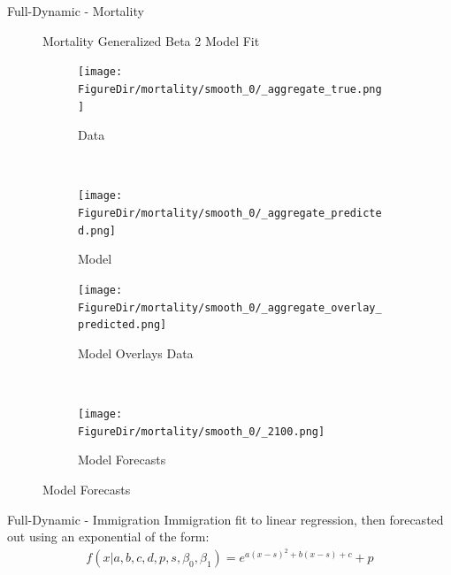 \documentclass[12pt]{beamer}
\newcommand*{\FigureDir}{../graphs}
\begin{document}
\begin{frame}{Full-Dynamic - Mortality}

	\begin{figure}[H]
		Mortality Generalized Beta 2 Model Fit
		\begin{subfigure}{0.5\textwidth}
			\centering
			\texttt{[image: \\FigureDir/mortality/smooth\_0/\_aggregate\_true.png]}
			\vspace{-5mm}
			\caption{Data}
		\end{subfigure}%
		~ %
		\begin{subfigure}{0.5\textwidth}
			\centering
			\texttt{[image: \\FigureDir/mortality/smooth\_0/\_aggregate\_predicted.png]}
			\vspace{-5mm}
			\caption{Model}
		\end{subfigure}%
		\newline
		\begin{subfigure}{0.5\textwidth}
			\centering
			\texttt{[image: \\FigureDir/mortality/smooth\_0/\_aggregate\_overlay\_predicted.png]}
			\vspace{-5mm}
			\caption{Model Overlays Data}
		\end{subfigure}%
		~ %
		\begin{subfigure}{0.5\textwidth}
			\centering
			\texttt{[image: \\FigureDir/mortality/smooth\_0/\_2100.png]}
			\vspace{-5mm}
			\caption{Model Forecasts}
		\end{subfigure}%
	\end{figure}

\end{frame}

\begin{frame}{Full-Dynamic - Immigration}
	Immigration fit to linear regression, then forecasted out using an exponential of the form:
	\begin{align*}
		f(x|a, b, c, d, p, s, \beta_0, \beta_1) = e^{a(x-s)^2 + b(x-s) + c} + p 
	 \end{align*}
\end{frame}
\end{document}

